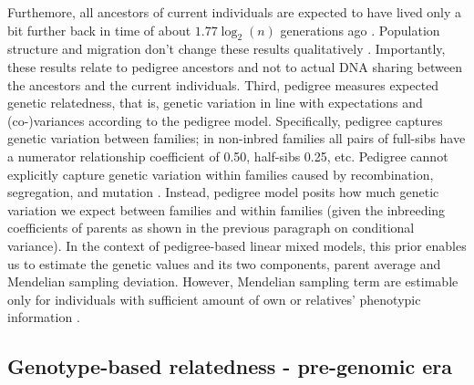 %
Furthemore, all ancestors of current individuals are expected to have lived
only a bit further back in time of about $1.77 \log_2(n)$ generations ago
\citep{chang1999recent}.
%
Population structure and migration don't change these results qualitatively
\citep{hein2004pedigree, rohde2004modelling}.
%
Importantly, these results relate to pedigree ancestors and not to
actual DNA sharing between the ancestors and the current individuals.
%
Third, pedigree measures expected genetic relatedness, that is,
genetic variation in line with expectations and (co-)variances
according to the pedigree model.
%
Specifically, pedigree captures genetic variation between families;
in non-inbred families all pairs of full-sibs have a numerator
relationship coefficient of 0.50, half-sibs 0.25, etc.
%
Pedigree cannot explicitly capture genetic variation within families
caused by recombination, segregation, and mutation
\citep[e.g.,][]{visscher2006assumption, hill2011variation, thompson2013identity,
garciacortes2013variance, white2020effect}.
%
Instead, pedigree model posits how much genetic variation we expect
between families and within families (given the inbreeding coefficients
of parents as shown in the previous paragraph on conditional variance).
%
In the context of pedigree-based linear mixed models, this prior
enables us to estimate the genetic values and its two components,
parent average and Mendelian sampling deviation.
%
However, Mendelian sampling term are estimable only for individuals
with sufficient amount of own or relatives' phenotypic information
\citep{henderson1984applications, mrode2023linear}.
%
%
%


\subsection{Genotype-based relatedness - pre-genomic era}

